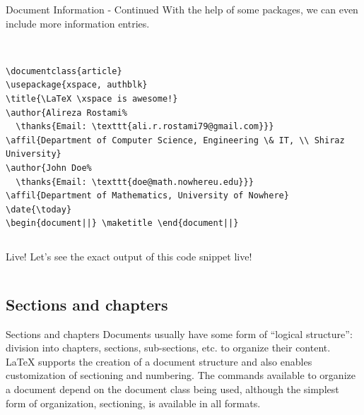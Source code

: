 \documentclass[10pt,xcolor={dvipsnames}, aspectratio=169]{beamer}
\begin{document}
\begin{frame}[fragile]{Document Information - Continued}
    With the help of some packages, we can even include more information entries.
    \smallskip
    \begin{columns}
        \begin{column}{0.9 \textwidth}
        \begin{verbatim}
        
\documentclass{article}
\usepackage{xspace, authblk}
\title{\LaTeX \xspace is awesome!}
\author{Alireza Rostami%
  \thanks{Email: \texttt{ali.r.rostami79@gmail.com}}}
\affil{Department of Computer Science, Engineering \& IT, \\ Shiraz University}
\author{John Doe%
  \thanks{Email: \texttt{doe@math.nowhereu.edu}}}
\affil{Department of Mathematics, University of Nowhere}
\date{\today}
\begin{document||} \maketitle \end{document||}
        \end{verbatim}
		\end{column}
    \end{columns}
    \begin{center}
    \begin{columns}
        \begin{column}{0.5 \textwidth}
        \begin{block}{Live!}
            Let's see the exact output of this code snippet \textcolor{latexBird}{live}!
		\end{block}
		\end{column}
    \end{columns}
    \end{center}
\end{frame}
\subsection{Sections and chapters}
\begin{frame}[fragile]{Sections and chapters}
    Documents usually have some form of “logical structure”: division into chapters, sections, sub-sections, etc. to organize their content. \LaTeX \xspace supports the creation of a document structure and also enables customization of sectioning and numbering. The commands available to organize a document depend on the document class being used, although the simplest form of organization, sectioning, is available in all formats.
    \end{frame}
    
\end{document}
